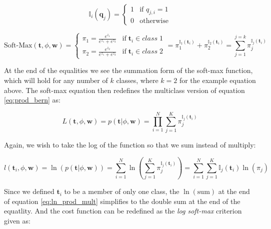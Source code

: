 \message{ !name(main.tex)}\documentclass[11pt]{article}
\begin{document}
\begin{equation}
  \mathbb{I}_{i}\left(\mathbf{q}_{j}\right) =
  \begin{cases}
    1 & \text{if } q_{j,i} = 1\\
    0 & \text{otherwise}
  \end{cases}
\end{equation}

\begin{equation}\label{eq:softmax}
  \text{Soft-Max}\left(\mathbf{t},\phi,\mathbf{w}\right) = 
  \begin{cases}
    \pi_{1} = \frac{e^{z_{1}}}{e^{z_{1}} + e^{z_{2}}} & \mathrm{if\;}\mathbf{t}_{i}\in class\;1\\
    \pi_{2} = \frac{e^{z_{2}}}{e^{z_{1}} + e^{z_{2}}} & \mathrm{if\;}\mathbf{t}_{i}\in class\;2
  \end{cases}
  =
  \pi^{\mathbb{I}_{1}(\mathbf{t}_{i})}_{1} + \pi^{\mathbb{I}_{2}(\mathbf{t}_{i})}_{2}
  = \sum_{j=1}^{j=k}\pi^{\mathbb{I}_{j}(\mathbf{t}_{i})}_{j}
\end{equation}

At the end of the equalities we see the summation form of the soft-max function, which will hold for any number of $k$ classes, where $k = 2$ for the example equation above. The soft-max equation then redefines the multiclass version of equation \ref{eq:prod_bern} as:

\begin{equation}\label{eq:prod_mult}
  L\left(\mathbf{t},\phi,\mathbf{w}\right) = p\left(\mathbf{t} | \phi, \mathbf{w}\right) = \prod_{i=1}^{N} \sum_{j=1}^{K}\pi_{j}^{\mathbb{I}_{j}\left(\mathbf{t}_{i}\right)}
\end{equation}

Again, we wish to take the log of the function so that we sum instead of multiply:

\begin{equation}\label{eq:ln_prod_mult}
  l\left(\mathbf{t}_{i},\phi,\mathbf{w}\right) = \ln\left(p\left(\mathbf{t}|\phi,\mathbf{w}\right)\right) = \sum_{i = 1}^{N}\ln\left(\sum_{j=1}^{K}\pi_{j}^{\mathbb{I}_{j}\left(\mathbf{t}_{i}\right)}\right) = \sum_{i=1}^{N}  \sum_{j=1}^{K} \mathbb{I}_{j}\left(\mathbf{t}_{i}\right) \ln\left(\pi_{j}\right)
\end{equation}

Since we defined $\mathbf{t}_{i}$ to be a member of only one class, the $\ln\left(\text{sum}\right)$ at the end of equation \ref{eq:ln_prod_mult} simplifies to the double sum at the end of the equatlity. And the cost function can be redefined as the \emph{log soft-max} criterion given as:
\end{document}
